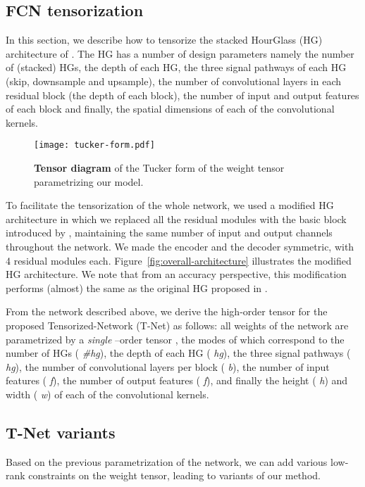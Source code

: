 \documentclass[10pt,twocolumn,letterpaper]{article}
\begin{document}
\subsection{FCN tensorization}

In this section, we describe how to tensorize the stacked HourGlass (HG) architecture of \cite{newell2016stacked}. The HG  has a number of design parameters namely the number of (stacked) HGs, the depth of each HG, the three signal pathways of each HG (skip, downsample and upsample), the number of convolutional layers in each residual block (\myie the depth of each block), the number of input and output features of each block and finally, the spatial dimensions of each of the convolutional kernels. 

\begin{figure}
    \centering
    \texttt{[image: tucker-form.pdf]}
    \caption{\textbf{Tensor diagram} of the Tucker form of the weight tensor  parametrizing our model.}
    \label{fig:tucker-form}
    \vspace{-10pt}
\end{figure}


To facilitate the tensorization of the whole network, we used a modified HG architecture in which we replaced all the residual modules with the basic block introduced by \cite{he2016deep}, maintaining the same number of input and output channels throughout the network. We made the encoder and the decoder symmetric, with 4 residual modules each. Figure~\ref{fig:overall-architecture} illustrates the modified HG architecture. We note that from an accuracy perspective, this modification performs (almost) the same as the original HG proposed in \cite{newell2016stacked}.

From the network described above, we derive the high-order tensor for the proposed Tensorized-Network (T-Net) as follows: all weights of the network are parametrized by a \emph{single} --order tensor , the modes of which correspond to the number of HGs ( \emph{\#hg}), the depth of each HG ( \emph{hg}), the three signal pathways ( \emph{hg}), the number of convolutional layers per block ( \emph{b}), the number of input features ( \emph{f}), the number of output features ( \emph{f}), and finally the height ( \emph{h}) and width ( \emph{w}) of each of the convolutional kernels. 

\subsection{T-Net variants}
Based on the previous parametrization of the network, we can add various low-rank constraints on the weight tensor, leading to variants of our method.
\end{document}
